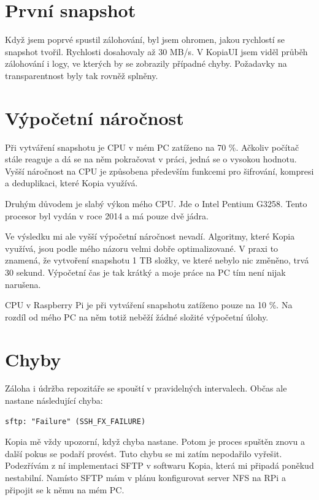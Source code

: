 \documentclass[a4paper,12pt, oneside]{book}
\begin{document}
\newpage

\section{První snapshot}

Když jsem poprvé spustil zálohování, byl jsem ohromen, jakou rychlostí se 
snapshot tvořil. Rychlosti dosahovaly až 30 MB/s. V KopiaUI jsem viděl průběh
zálohování i logy, ve kterých by se zobrazily případné chyby. Požadavky 
na transparentnost byly tak rovněž splněny.

\newpage

\section{Výpočetní náročnost}

Při vytváření snapshotu je CPU v mém PC zatíženo na 70 \%. Ačkoliv
počítač stále reaguje a dá se na něm pokračovat v práci, jedná se o vysokou
hodnotu. Vyšší náročnost na CPU je způsobena především funkcemi pro šifrování, kompresi
a deduplikaci, které Kopia využívá. 

Druhým důvodem je slabý výkon mého CPU. Jde o Intel Pentium G3258.
Tento procesor byl vydán v roce 2014 a má pouze dvě jádra. 

Ve výsledku mi ale vyšší výpočetní náročnost nevadí. 
Algoritmy, které Kopia využívá, jsou podle mého názoru velmi dobře
optimalizované. V praxi to znamená, že vytvoření snapshotu 1 TB složky, ve které
nebylo nic změněno, trvá 30 sekund. Výpočetní čas je tak krátký a moje práce na
PC tím není nijak narušena.


CPU v Raspberry Pi je
při vytváření snapshotu zatíženo pouze na 10 \%. Na rozdíl od mého PC na něm totiž
neběží žádné složité výpočetní úlohy.




\section{Chyby}

Záloha i údržba repozitáře 
se spouští v pravidelných intervalech. Občas ale nastane následující chyba: 
\begin{lstlisting}
sftp: "Failure" (SSH_FX_FAILURE)
\end{lstlisting}

Kopia mě vždy upozorní, když chyba nastane. 
Potom je proces spuštěn znovu a další pokus se podaří provést. 
Tuto chybu se mi zatím nepodařilo vyřešit. Podezřívám z ní implementaci 
SFTP v softwaru Kopia, která mi připadá poněkud nestabilní. 
Namísto SFTP mám v plánu konfigurovat server NFS na RPi a připojit se k němu na
mém PC.
\end{document}
